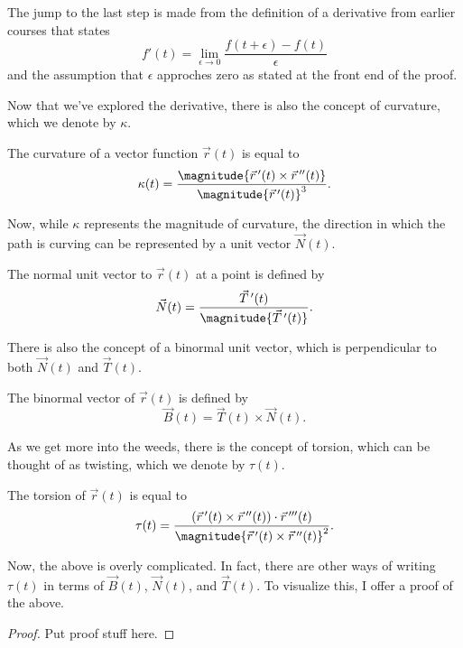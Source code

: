 \begin{remark}
    The jump to the last step is made from the definition of a derivative from earlier courses that states
    \[f'(t) = \lim_{\epsilon \to 0} \frac{f(t + \epsilon) - f(t)}{\epsilon}\]
    and the assumption that $\epsilon$ approches zero as stated at the front end of the proof.
\end{remark}

Now that we've explored the derivative, there is also the concept of curvature, which we denote by $\kappa$.

\begin{theorem}
    The curvature of a vector function $\vec{r}(t)$ is equal to
    \[\kappa(t) = \frac{\magnitude{\ddvec{r}(t) \times \vec{r}\,^{\prime\prime}(t)}}{\magnitude{\ddvec{r}(t)}^{3}}.\]
\end{theorem}

Now, while $\kappa$ represents the magnitude of curvature, the direction in which the path is curving can be represented by a unit vector $\vec{N}(t)$.

\begin{proposition}
    The normal unit vector to $\vec{r}(t)$ at a point is defined by
    \[\vec{N}(t) = \frac{\ddvec{T}(t)}{\magnitude{\ddvec{T}(t)}}.\]
\end{proposition}

There is also the concept of a binormal unit vector, which is perpendicular to both $\vec{N}(t)$ and $\vec{T}(t)$.

\begin{proposition}
    The binormal vector of $\vec{r}(t)$ is defined by
    \[\vec{B}(t) = \vec{T}(t) \times \vec{N}(t).\]
\end{proposition}

As we get more into the weeds, there is the concept of torsion, which can be thought of as twisting, which we denote by $\tau(t)$.

\begin{proposition}
    The torsion of $\vec{r}(t)$ is equal to
    \[\tau(t) = \frac{(\ddvec{r}(t) \times \vec{r}\,^{\prime\prime}(t)) \cdot \vec{r}\,^{\prime\prime\prime}(t)}{\magnitude{\ddvec{r}(t) \times \vec{r}\,^{\prime\prime}(t)}^{2}}.\]
\end{proposition}

Now, the above is overly complicated. In fact, there are other ways of writing $\tau(t)$ in terms of $\vec{B}(t)$, $\vec{N}(t)$, and $\vec{T}(t)$. To visualize this, I offer a proof of the above.

\begin{proof}
    Put proof stuff here.
\end{proof}